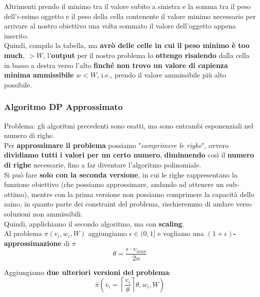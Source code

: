 \documentclass[11pt]{article}
\begin{document}
	Altrimenti prendo il minimo tra il valore subito a sinistra e la somma tra il peso dell'$i$-esimo oggetto e il peso della cella contenente il valore minimo necessario per arrivare al nostro obiettivo una volta sommato il valore dell'oggetto appena inserito.\\
	
	Quindi, compilo la tabella, ma \textbf{avrò delle celle in cui il peso minimo è too much}, $> W$, l'\textbf{output} per il nostro problema lo \textbf{ottengo risalendo} dalla cella in basso a destra verso l'alto \textbf{finché non trovo un valore di capienza minima ammissibile} $w < W$, i.e., prendo il valore ammissibile più alto possibile.\\
	
	\newpage
	
	\subsubsection{Algoritmo DP Approssimato}
	
	Problema: gli algoritmi precedenti sono esatti, ma sono entrambi esponenziali nel numero di righe.\\
	
	Per \textbf{approssimare il problema} possiamo "\textit{comprimere le righe}", ovvero \textbf{dividiamo tutti i valori per un certo numero}, \textbf{diminuendo} così il \textbf{numero di righe} necessarie, fino a far diventare l'algoritmo polinomiale.\\
	
	Si può fare \textbf{solo con la seconda versione}, in cui le righe rappresentano la funzione obiettivo (che possiamo approssimare, andando ad ottenere un sub-ottimo), mentre con la prima versione non possiamo comprimere la capacità dello zaino, in quanto parte dei constraint del problema, rischieremmo di andare verso soluzioni non ammissibili.\\
	
	Quindi, applichiamo il secondo algoritmo, ma con \textbf{scaling}.\\
	
	Al problema $\pi (v_i, w_i, W)$ aggiungiamo $\epsilon \in (0,1]$ e vogliamo una \textbf{$(1+\epsilon)$-approssimazione} di $\pi$
	$$ \theta = \frac{\epsilon \cdot v_{max}}{2n}$$
	
	Aggiungiamo \textbf{due ulteriori versioni del problema}: 
	$$ \overline{\pi} \left(\overline{v}_i = \left\lceil \frac{v_i}{\theta} \right\rceil \theta, w_i, W\right) $$
	
\end{document}
